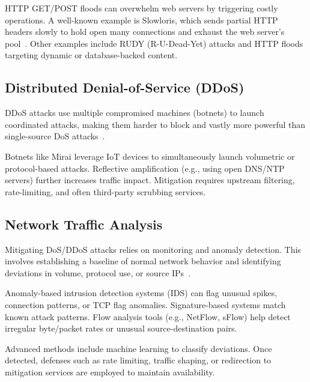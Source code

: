 \documentclass{report}
\begin{document}
HTTP GET/POST floods can overwhelm web servers by triggering costly operations. A well-known example is Slowloris, which sends partial HTTP headers slowly to hold open many connections and exhaust the web server’s pool~\cite{netscout_slowloris}. Other examples include RUDY (R-U-Dead-Yet) attacks and HTTP floods targeting dynamic or database-backed content.

\subsection{Distributed Denial-of-Service (DDoS)}
DDoS attacks use multiple compromised machines (botnets) to launch coordinated attacks, making them harder to block and vastly more powerful than single-source DoS attacks~\cite{fidelis_dos}.

Botnets like Mirai leverage IoT devices to simultaneously launch volumetric or protocol-based attacks. Reflective amplification (e.g., using open DNS/NTP servers) further increases traffic impact. Mitigation requires upstream filtering, rate-limiting, and often third-party scrubbing services.

\subsection{Network Traffic Analysis}
Mitigating DoS/DDoS attacks relies on monitoring and anomaly detection. This involves establishing a baseline of normal network behavior and identifying deviations in volume, protocol use, or source IPs~\cite{fidelis_dos, mdpi_dos}.

Anomaly-based intrusion detection systems (IDS) can flag unusual spikes, connection patterns, or TCP flag anomalies. Signature-based systems match known attack patterns. Flow analysis tools (e.g., NetFlow, sFlow) help detect irregular byte/packet rates or unusual source-destination pairs.

Advanced methods include machine learning to classify deviations. Once detected, defenses such as rate limiting, traffic shaping, or redirection to mitigation services are employed to maintain availability.


\end{document}
